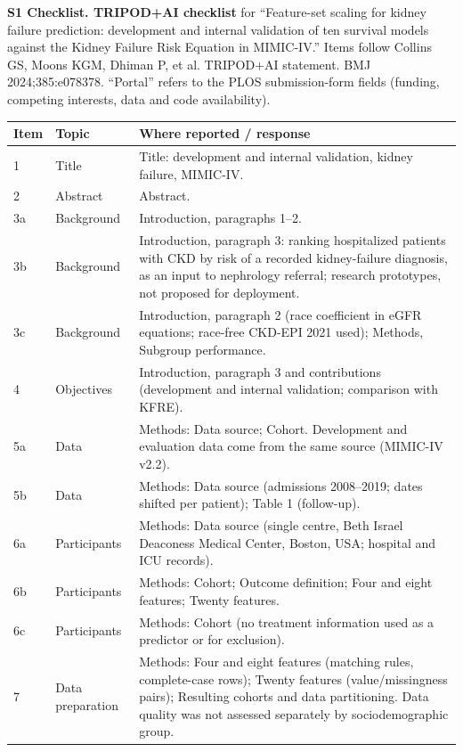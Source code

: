 \documentclass[9pt]{extarticle}
\begin{document}
\noindent\textbf{S1 Checklist. TRIPOD+AI checklist} for ``Feature-set scaling for kidney failure prediction: development and internal validation of ten survival models against the Kidney Failure Risk Equation in MIMIC-IV.'' Items follow Collins GS, Moons KGM, Dhiman P, et al. TRIPOD+AI statement. BMJ 2024;385:e078378. ``Portal'' refers to the PLOS submission-form fields (funding, competing interests, data and code availability).

\medskip
\begin{longtable}{@{}p{}p{}p{}@{}}
\toprule
\textbf{Item} & \textbf{Topic} & \textbf{Where reported / response} \\
\midrule
\endhead
1 & Title & Title: development and internal validation, kidney failure, MIMIC-IV. \\
2 & Abstract & Abstract. \\
3a & Background & Introduction, paragraphs 1--2. \\
3b & Background & Introduction, paragraph 3: ranking hospitalized patients with CKD by risk of a recorded kidney-failure diagnosis, as an input to nephrology referral; research prototypes, not proposed for deployment. \\
3c & Background & Introduction, paragraph 2 (race coefficient in eGFR equations; race-free CKD-EPI 2021 used); Methods, Subgroup performance. \\
4 & Objectives & Introduction, paragraph 3 and contributions (development and internal validation; comparison with KFRE). \\
5a & Data & Methods: Data source; Cohort. Development and evaluation data come from the same source (MIMIC-IV v2.2). \\
5b & Data & Methods: Data source (admissions 2008--2019; dates shifted per patient); Table 1 (follow-up). \\
6a & Participants & Methods: Data source (single centre, Beth Israel Deaconess Medical Center, Boston, USA; hospital and ICU records). \\
6b & Participants & Methods: Cohort; Outcome definition; Four and eight features; Twenty features. \\
6c & Participants & Methods: Cohort (no treatment information used as a predictor or for exclusion). \\
7 & Data preparation & Methods: Four and eight features (matching rules, complete-case rows); Twenty features (value/missingness pairs); Resulting cohorts and data partitioning. Data quality was not assessed separately by sociodemographic group. \\

\end{longtable}
\end{document}
